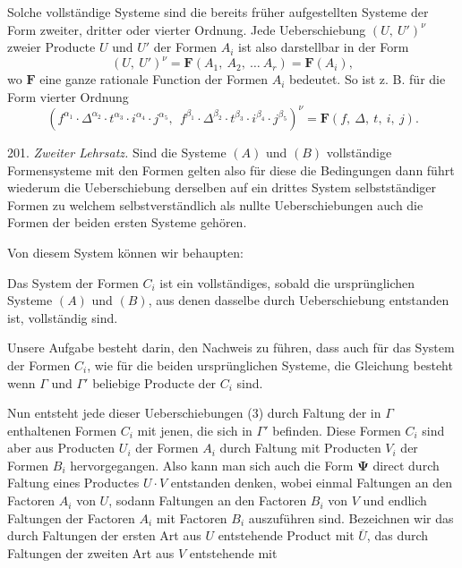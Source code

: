 Solche vollständige Systeme sind die bereits früher aufgestellten
Systeme der Form zweiter, dritter oder vierter Ordnung. Jede
Ueberschiebung $(U,\ U')^\nu$ zweier Producte $U$ und $U'$ der Formen
$A_i$ ist also darstellbar in der Form
\[ (U,\ U')^\nu = \boldsymbol{F}(A_1,\ A_2,\ \ldots\ A_r) = \boldsymbol{F}(A_i), \]
wo $\boldsymbol{F}$ eine ganze rationale Function der Formen $A_i$ bedeutet. So ist
z. B. für die Form vierter Ordnung
\[ (f^{\alpha_1}\cdot \Delta^{\alpha_2}\cdot t^{\alpha_3}\cdot i^{\alpha_4}\cdot j^{\alpha_5},\ \ f^{\beta_1}\cdot \Delta^{\beta_2}\cdot t^{\beta_3}\cdot i^{\beta_4}\cdot j^{\beta_5})^\nu = \boldsymbol{F}(f,\ \Delta,\ t,\ i,\ j). \]

201. \textit{Zweiter Lehrsatz.} Sind die Systeme $(A)$ und $(B)$
vollständige Formensysteme mit den Formen
gelten also für diese die Bedingungen
dann führt wiederum die Ueberschiebung derselben auf ein drittes
System selbstständiger Formen
zu welchem selbstverständlich als nullte Ueberschiebungen auch die
Formen der beiden ersten Systeme gehören.

Von diesem System können wir behaupten:

\glqq Das System der Formen $C_i$ ist ein vollständiges, sobald die
ursprünglichen Systeme $(A)$ und $(B)$, aus denen dasselbe durch
Ueberschiebung entstanden ist, vollständig sind.\grqq{}

Unsere Aufgabe besteht darin, den Nachweis zu führen, dass auch
für das System der Formen $C_i$, wie für die beiden ursprünglichen
Systeme, die Gleichung besteht
wenn $\Gamma$ und $\Gamma'$ beliebige Producte der $C_i$ sind.

Nun entsteht jede dieser Ueberschiebungen (3) durch Faltung der
in $\Gamma$ enthaltenen Formen $C_i$ mit jenen, die sich in $\Gamma'$
befinden. Diese Formen $C_i$ sind aber aus Producten $U_i$ der Formen
$A_i$ durch Faltung mit Producten $V_i$ der Formen $B_i$ hervorgegangen.
Also kann man sich auch die Form $\boldsymbol{\Psi}$ direct durch Faltung eines
Productes $U\cdot V$ entstanden denken, wobei einmal Faltungen an den
Factoren $A_i$ von $U$, sodann Faltungen an den Factoren $B_i$ von $V$
und endlich Faltungen der Factoren $A_i$ mit Factoren $B_i$ auszuführen
sind. Bezeichnen wir das durch Faltungen der ersten Art aus $U$
entstehende Product mit $\overline U$, das durch Faltungen der zweiten
Art aus $V$ entstehende mit


